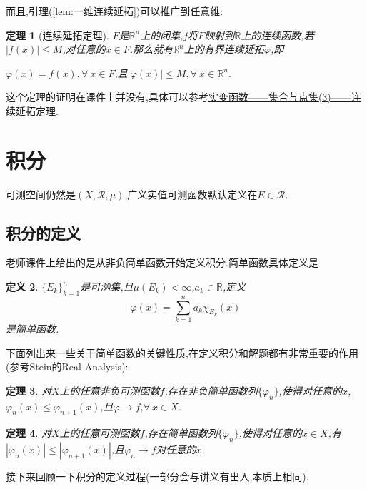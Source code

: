 \documentclass[12pt,a4paper,oneside]{ctexart}
\theoremstyle{nonumberplain}
\theoremstyle{plain}
\newtheorem{theorem}{定理}[section]
\theoremstyle{plain}
\theoremstyle{nonumberplain}
\theoremstyle{plain}
\theoremstyle{plain}
\newtheorem{definition}[theorem]{定义}
\theoremstyle{plain}
\theoremstyle{plain}
\newcommand{\R}{\mathbb{R}}
\renewcommand{\phi}{\varphi}
\newcommand{\cR}{\mathcal{R}}
\begin{document}
    而且,引理(\ref{lem:一维连续延拓})可以推广到任意维:
    \begin{theorem}[连续延拓定理]
        $F$是$\R^n$上的闭集,$f$将$F$映射到$\R$上的连续函数,若$|f(x)|\leqslant M$,对任意的$x\in F$.那么就有$\R^n$上的有界连续延拓$\phi$,即
        \begin{center}
            $\phi(x)=f(x),\forall\ x\in F$,且$|\phi(x)|\leqslant M,\forall\ x\in \R^n$.
        \end{center}
    \end{theorem}
    这个定理的证明在课件上并没有,具体可以参考\href{https://zhuanlan.zhihu.com/p/468193827}{实变函数——集合与点集(3)——连续延拓定理}.

    \section{积分}

    可测空间仍然是$(X,\cR,\mu)$,广义实值可测函数默认定义在$E\in\cR$.

    \subsection{积分的定义}

    老师课件上给出的是从非负简单函数开始定义积分.简单函数具体定义是
    \begin{definition}
        $\{E_k\}_{k=1}^n$是可测集,且$\mu(E_k)<\infty$,$a_k\in\R$,定义
        \begin{equation*}
            \phi(x)=\sum_{k=1}^na_k\chi_{E_k}(x) 
        \end{equation*}
        是简单函数.
    \end{definition}

    下面列出来一些关于简单函数的关键性质,在定义积分和解题都有非常重要的作用(参考Stein的Real Analysis):
    \begin{theorem}
        \label{thm:非负可测函数的简单函数逼近}
        对$X$上的任意非负可测函数$f$,存在非负简单函数列$\{\phi_n\}$,使得对任意的$x$,$\phi_n(x)\leqslant \phi_{n+1}(x)$,且$\phi\to f$,$\forall\ x\in X$.
    \end{theorem}

    \begin{theorem}
        \label{thm:可测函数的简单函数逼近}
        对$X$上的任意可测函数$f$,存在简单函数列$\{\phi_n\}$,使得对任意的$x\in X$,有$|\phi_n(x)|\leqslant |\phi_{n+1}(x)|$,且$\phi_n\to f$对任意的$x$.
    \end{theorem}

    接下来回顾一下积分的定义过程(一部分会与讲义有出入,本质上相同).
\end{document}
